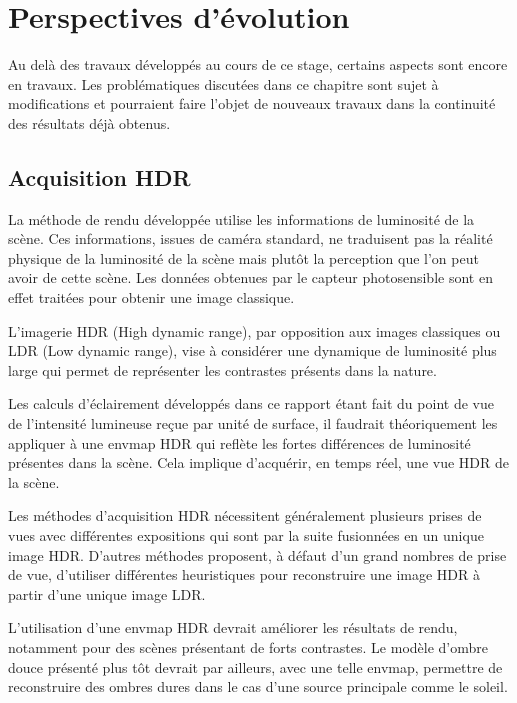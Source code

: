 \documentclass[10pt,a4paper,twoside, twocolumn]{report}
\begin{document}
\iftwocolumn \twocolumn \else \onecolumn \fi


\chapter{Perspectives d’évolution}

Au delà des travaux développés au cours de ce stage, certains aspects sont encore en travaux. Les problématiques discutées dans ce chapitre sont sujet à modifications et pourraient faire l’objet de nouveaux travaux dans la continuité des résultats déjà obtenus.


\section{Acquisition HDR}

La méthode de rendu développée utilise les informations de luminosité de la scène. Ces informations, issues de caméra standard, ne traduisent pas la réalité physique de la luminosité de la scène mais plutôt la perception que l’on peut avoir de cette scène. Les données obtenues par le capteur photosensible sont en effet traitées pour obtenir une image classique.

L’imagerie HDR (High dynamic range), par opposition aux images classiques ou LDR (Low dynamic range), vise à considérer une dynamique de luminosité plus large qui permet de représenter les contrastes présents dans la nature. 

Les calculs d’éclairement développés dans ce rapport étant fait du point de vue de l’intensité lumineuse reçue par unité de surface, il faudrait théoriquement les appliquer à une envmap HDR qui reflète les fortes différences de luminosité présentes dans la scène. Cela implique d’acquérir, en temps réel, une vue HDR de la scène. 

Les méthodes d’acquisition HDR nécessitent généralement plusieurs prises de vues avec différentes expositions qui sont par la suite fusionnées en un unique image HDR. D’autres méthodes proposent, à défaut d’un grand nombres de prise de vue, d’utiliser différentes heuristiques pour reconstruire une image HDR à partir d’une unique image LDR\cite{Rempel2006}.

L’utilisation d’une envmap HDR devrait améliorer les résultats de rendu, notamment pour des scènes présentant de forts contrastes. Le modèle d’ombre douce présenté plus tôt devrait par ailleurs, avec une telle envmap, permettre de reconstruire des ombres dures dans le cas d’une source principale comme le soleil.
\end{document}
